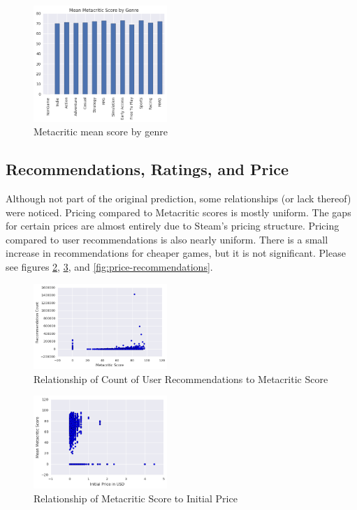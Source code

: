 \documentclass[letterpaper,10pt,twocolumn]{article}
\begin{document}
\begin{figure}[H]
    \label{fig:genre-metacritic}
    \caption{Metacritic mean score by genre}
    \includegraphics[width=0.45\textwidth,keepaspectratio]{genre-metacritic-bar}
\end{figure}

\subsection{Recommendations, Ratings, and Price}

Although not part of the original prediction, some relationships (or lack
thereof) were noticed. Pricing compared to Metacritic scores is mostly
uniform. The gaps for certain prices are almost entirely due to Steam's
pricing structure. Pricing compared to user recommendations is also nearly
uniform. There is a small increase in recommendations for cheaper games, but
it is not significant. Please see figures
\ref{fig:metacritic-recommendations},
\ref{fig:metacritic-price}, and
\ref{fig:price-recommendations}.

\begin{figure}[H]
    \label{fig:metacritic-recommendations}
    \caption{Relationship of Count of User Recommendations to Metacritic Score}
    \includegraphics[width=0.45\textwidth,keepaspectratio]{metacritic-recommendations-scatter}
\end{figure}

\begin{figure}[H]
    \label{fig:metacritic-price}
    \caption{Relationship of Metacritic Score to Initial Price}
    \includegraphics[width=0.45\textwidth,keepaspectratio]{price-metacritic-scatter}
\end{figure}
\end{document}
